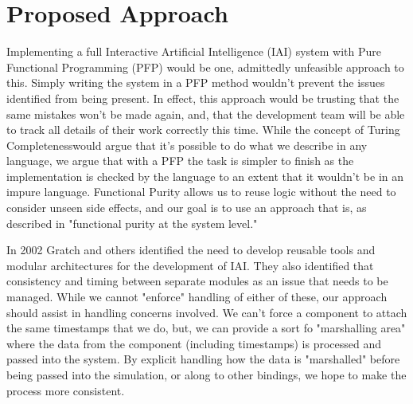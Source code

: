 


\section{Proposed Approach}

Implementing a full Interactive Artificial Intelligence (IAI) system with Pure Functional Programming (PFP) would be one, admittedly unfeasible approach to this.
    Simply writing the system in a PFP method wouldn't prevent the issues identified from being present. 
        In effect, this approach would be trusting that the same mistakes won't be made again, and, that the development team will be able to track all details of their work correctly this time.
    While the concept of Turing Completeness\footnotemark would argue that it's possible to do what we describe in any language, we argue that with a PFP the task is simpler to finish as the implementation is checked by the language to an extent that it wouldn't be in an impure language.
    Functional Purity allows us to reuse logic without the need to consider unseen side effects, and our goal is to use an approach that is, as described in\cite{perez2017testing} "functional purity at the system level."

In 2002 Gratch and others identified the need to develop reusable tools and modular architectures for the development of IAI.\cite{gratch_creating_2002}
They also identified that consistency and timing between separate modules as an issue that needs to be managed.
    While we cannot "enforce" handling of either of these, our approach should assist in handling concerns involved.
        We can't force a component to attach the same timestamps that we do, but, we can provide a sort fo "marshalling area" where the data from the component (including timestamps) is processed and passed into the system.
    By explicit handling how the data is "marshalled" before being passed into the simulation, or along to other bindings, we hope to make the process more consistent.

